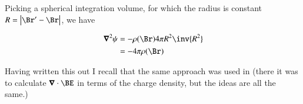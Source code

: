 \documentclass{article}
\begin{document}
Picking a spherical integration volume, for which the radius is constant $R = \Abs{\Br'-\Br}$, we have

\begin{align*}
\spacegrad^2 \psi 
&= -\rho(\Br) 4 \pi R^2 \inv{R^2} \\
&= - 4 \pi \rho(\Br)
\end{align*}

Having written this out I recall that the same approach was used in
\cite{schwartz1987pe} (there it was to calculate $\spacegrad \cdot \BE$ in terms of the charge density, but the ideas are all the same.)



\end{document}
